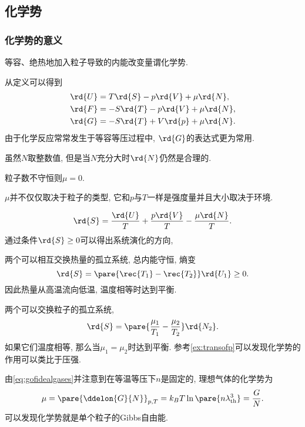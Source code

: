 \documentclass[../Thermal.tex]{subfiles}
\begin{document}
\subsection{化学势}
\subsubsection{化学势的意义}
\begin{definition}
等容、绝热地加入粒子导致的内能改变量谓化学势.
\end{definition}
从定义可以得到
\begin{align*}
\rd{U} &= T\rd{S} - p\rd{V} + \mu \rd{N},\\
\rd{F} &= -S\rd{T} - p\rd{V} + \mu \rd{N},\\
\rd{G} &= -S\rd{T} + V\rd{p} + \mu\rd{N}.
\end{align*}
由于化学反应常常发生于等容等压过程中, $\rd{G}$的表达式更为常用.
\begin{remark}
虽然$N$取整数值, 但是当$N$充分大时$\rd{N}$仍然是合理的.
\end{remark}
\begin{corollary}
\label{coll:muiszero}
粒子数不守恒则$\mu=0$.
\end{corollary}
\begin{pitfall}
$\mu$并不仅仅取决于粒子的类型, 它和$p$与$T$一样是强度量并且大小取决于环境.
\end{pitfall}
\begin{equation}
\label{eq:sinuvn}
\rd{S} = \frac{\rd{U}}{T} + \frac{p\rd{V}}{T} - \frac{\mu \rd{N}}{T}.
\end{equation}
通过条件$\rd{S}\ge 0$可以得出系统演化的方向,
\begin{ex}
两个可以相互交换热量的孤立系统, 总内能守恒, 熵变
\[ \rd{S} = \pare{\rec{T_1} - \rec{T_2}}\rd{U_1} \ge 0. \]
因此热量从高温流向低温, 温度相等时达到平衡.
\end{ex}
\begin{ex}
两个可以交换粒子的孤立系统,
\[ \rd{S} = \pare{\frac{\mu_1}{T_1} - \frac{\mu_2}{T_2}}\rd{N_2}. \]
如果它们温度相等, 那么当$\mu_1=\mu_2$时达到平衡. 参考\cref{ex:transofp}可以发现化学势的作用可以类比于压强.
\end{ex}
\begin{ex}
\label{ex:muofidealgases}
由\eqref{eq:gofidealgases}并注意到在等温等压下$n$是固定的, 理想气体的化学势为
\[ \mu = \pare{\ddelon{G}{N}}_{p,T} = k_B T \ln\pare{n\lambda_{\mathrm{th}}^3} = \frac{G}{N}. \]
可以发现化学势就是单个粒子的Gibbs自由能.
\end{ex}
\end{document}

